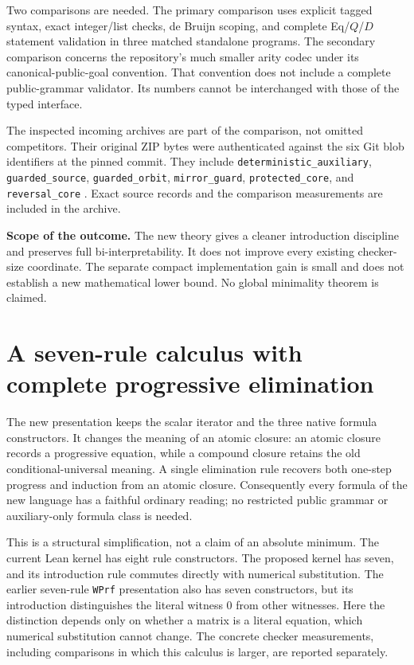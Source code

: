 \documentclass[11pt,a4paper]{article}
\theoremstyle{definition}
\begin{document}
Two comparisons are needed. The primary comparison uses explicit tagged
syntax, exact integer/list checks, de Bruijn scoping, and complete
Eq/$Q$/$D$ statement validation in three matched standalone programs.
The secondary comparison concerns the repository's much smaller arity
codec under its canonical-public-goal convention. That convention does
not include a complete public-grammar validator. Its numbers cannot be
interchanged with those of the typed interface.

The inspected incoming archives are part of the comparison, not omitted
competitors. Their original ZIP bytes were authenticated against the six
Git blob identifiers at the pinned commit. They include
\texttt{deterministic\_auxiliary}, \texttt{guarded\_source},
\texttt{guarded\_orbit}, \texttt{mirror\_guard},
\texttt{protected\_core}, and \texttt{reversal\_core}
\cite{incoming}. Exact source records and the comparison measurements
are included in the archive.

\textbf{Scope of the outcome.}
The new theory gives a cleaner introduction discipline and preserves full
bi-interpretability. It does not improve every existing checker-size
coordinate. The separate compact implementation gain is small and does
not establish a new mathematical lower bound. No global minimality
theorem is claimed.


\providecommand{\llbracket}{[\![}
\providecommand{\rrbracket}{]\!]}
\section{A seven-rule calculus with complete progressive elimination}
\label{sec:new-calculus}

The new presentation keeps the scalar iterator and the three native formula
constructors.  It changes the meaning of an atomic closure: an atomic closure
records a progressive equation, while a compound closure retains the old
conditional-universal meaning.  A single elimination rule recovers both
one-step progress and induction from an atomic closure.  Consequently every
formula of the new language has a faithful ordinary reading; no restricted
public grammar or auxiliary-only formula class is needed.

This is a structural simplification, not a claim of an absolute minimum.  The
current Lean kernel has eight rule constructors.  The proposed kernel has
seven, and its introduction rule commutes directly with numerical
substitution.  The earlier seven-rule \texttt{WPrf} presentation also has seven
constructors, but its introduction distinguishes the literal witness $0$ from
other witnesses.  Here the distinction depends only on whether a matrix is a
literal equation, which numerical substitution cannot change.  The concrete
checker measurements, including comparisons in which this calculus is larger,
are reported separately.\cite{native,witness}
\end{document}
